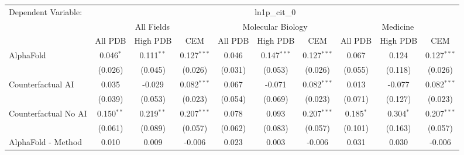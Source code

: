 \begingroup
\centering
\begin{tabular}{lccccccccc}
   \tabularnewline \midrule \midrule
   Dependent Variable: & \multicolumn{9}{c}{ln1p\_cit\_0}\\
 & \multicolumn{3}{c}{All Fields} & \multicolumn{3}{c}{Molecular Biology} & \multicolumn{3}{c}{Medicine} \\
\cmidrule(lr){2-7} \cmidrule(lr){5-10} \cmidrule(lr){8-7}
 & \multicolumn{1}{c}{All PDB} & \multicolumn{1}{c}{High PDB} & \multicolumn{1}{c}{CEM} & \multicolumn{1}{c}{All PDB} & \multicolumn{1}{c}{High PDB} & \multicolumn{1}{c}{CEM} & \multicolumn{1}{c}{All PDB} & \multicolumn{1}{c}{High PDB} & \multicolumn{1}{c}{CEM} \\
\cmidrule(lr){2-3} \cmidrule(lr){3-4} \cmidrule(lr){4-5} \cmidrule(lr){5-6} \cmidrule(lr){6-7} \cmidrule(lr){7-8} \cmidrule(lr){8-9} \cmidrule(lr){9-10} \cmidrule(lr){10-3}
   AlphaFold                                                   & 0.046$^{*}$   & 0.111$^{**}$  & 0.127$^{***}$ & 0.046         & 0.147$^{***}$  & 0.127$^{***}$ & 0.067         & 0.124          & 0.127$^{***}$\\   
                                                               & (0.026)       & (0.045)       & (0.026)       & (0.031)       & (0.053)        & (0.026)       & (0.055)       & (0.118)        & (0.026)\\   
   Counterfactual AI                                           & 0.035         & -0.029        & 0.082$^{***}$ & 0.067         & -0.071         & 0.082$^{***}$ & 0.013         & -0.077         & 0.082$^{***}$\\   
                                                               & (0.039)       & (0.053)       & (0.023)       & (0.054)       & (0.069)        & (0.023)       & (0.071)       & (0.127)        & (0.023)\\   
   Counterfactual No AI                                        & 0.150$^{**}$  & 0.219$^{**}$  & 0.207$^{***}$ & 0.078         & 0.093          & 0.207$^{***}$ & 0.185$^{*}$   & 0.304$^{*}$    & 0.207$^{***}$\\   
                                                               & (0.061)       & (0.089)       & (0.057)       & (0.062)       & (0.083)        & (0.057)       & (0.101)       & (0.163)        & (0.057)\\   
   AlphaFold - Method                                          & 0.010         & 0.009         & -0.006        & 0.023         & 0.003          & -0.006        & 0.031         & 0.030          & -0.006\\   

\end{tabular}
